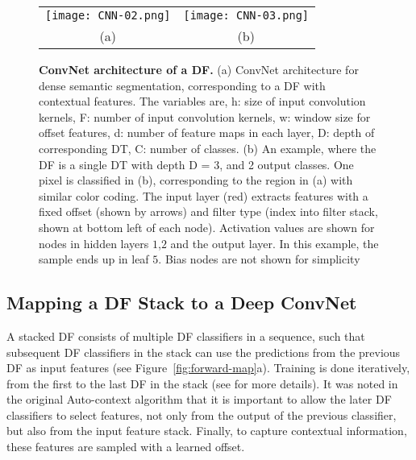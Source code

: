 \documentclass[twocolumn]{svjour3}
\begin{document}
\begin{figure*}[htp!]
\begin{center}
\begin{tabular}{cc}
		
   \texttt{[image: CNN-02.png]} &
   \texttt{[image: CNN-03.png]} \\
				   (a) & (b)
\end{tabular}
\end{center}
   \caption{\textbf{ConvNet architecture of a DF. } (a) ConvNet architecture for dense semantic segmentation, corresponding to a DF with contextual features. The variables are, h: size of input convolution kernels, F: number of input convolution kernels, w: window size for offset features, d: number of feature maps in each layer, D: depth of corresponding DT, C: number of classes. (b) An example, where the DF is a single DT with depth D = 3, and 2 output classes. One pixel is classified in (b), corresponding to the region in (a) with similar color coding. The input layer (red) extracts features with a fixed offset (shown by arrows) and filter type (index into filter stack, shown at bottom left of each node). Activation values are shown for nodes in hidden layers $1$,$2$ and the output layer. In this example, the sample ends up in leaf $5$. Bias nodes are not shown for simplicity}
\label{fig:ConvNet}
\end{figure*}

\subsection{Mapping a DF Stack to a Deep ConvNet}
\label{subsec:forward-map}

A stacked DF consists of multiple DF classifiers in a sequence, such that subsequent DF classifiers in the stack can use the predictions from the previous DF as input features (see Figure~\ref{fig:forward-map}a).
Training is done iteratively, from the first to the last DF in the stack (see \cite{Tu2010} for more details).
It was noted in the original Auto-context algorithm that it is important to allow the later DF classifiers to select features, not only from the output of the previous classifier, but also from the input feature stack.
Finally, to capture contextual information, these features are sampled with a learned offset.
\end{document}
